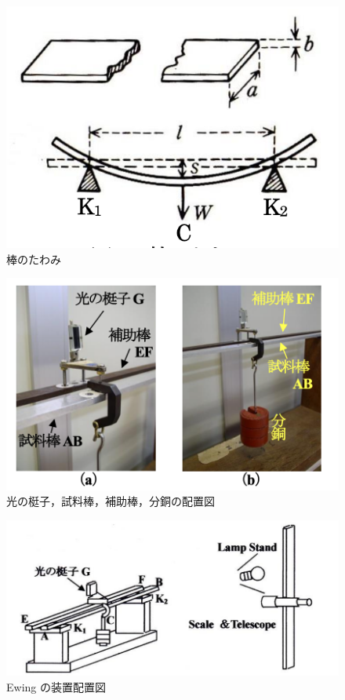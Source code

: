 \documentclass[a4paper,1pt]{jsarticle}
\begin{document}
\begin{figure}[h]
  \begin{center}
  \includegraphics[width=150mm]{actA.png}
  \caption{棒のたわみ}
  \end{center}
\end{figure}

\begin{figure}[h]
  \begin{center}
  \includegraphics[width=150mm]{actB.png}
  \caption{光の梃子，試料棒，補助棒，分銅の配置図}
  \end{center}
\end{figure}

\begin{figure}[h]
  \begin{center}
  \includegraphics[width=150mm]{actC.png}
  \caption{Ewing の装置配置図}
  \end{center}
\end{figure}
\end{document}
